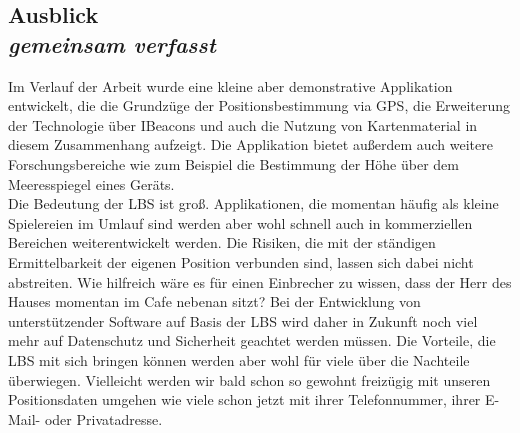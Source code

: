 \subsection[Ausblick]{Ausblick
 \\ \textnormal{\small{\textit {gemeinsam verfasst}}}}
Im Verlauf der Arbeit wurde eine kleine aber demonstrative Applikation entwickelt, die die Grundzüge der Positionsbestimmung via GPS, die Erweiterung der Technologie über IBeacons und auch die Nutzung von Kartenmaterial in diesem Zusammenhang aufzeigt. Die Applikation bietet außerdem auch weitere Forschungsbereiche wie zum Beispiel die Bestimmung der Höhe über dem Meeresspiegel eines Geräts.
\\
Die Bedeutung der LBS ist groß. Applikationen, die momentan häufig als kleine Spielereien im Umlauf sind werden aber wohl schnell auch in kommerziellen Bereichen weiterentwickelt werden. Die Risiken, die mit der ständigen Ermittelbarkeit der eigenen Position verbunden sind, lassen sich dabei nicht abstreiten. Wie hilfreich wäre es für einen Einbrecher zu wissen, dass der Herr des Hauses momentan im Cafe nebenan sitzt? Bei der Entwicklung von unterstützender Software auf Basis der LBS wird daher in Zukunft noch viel mehr auf Datenschutz und Sicherheit geachtet werden müssen. Die Vorteile, die LBS mit sich bringen können werden aber wohl für viele über die Nachteile überwiegen. Vielleicht werden wir bald schon so gewohnt freizügig mit unseren Positionsdaten umgehen wie viele schon jetzt mit ihrer Telefonnummer, ihrer E-Mail- oder Privatadresse.